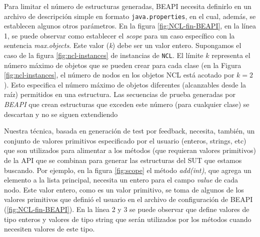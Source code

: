 Para limitar el número de estructuras generadas, BEAPI necesita definirlo en un archivo de descripción simple en formato \texttt{java.properties}, en el cual, además, se establecen algunos otros parámetros. En la figura \ref{fig:NCL-fin-BEAPI}, en la línea 1, se puede observar como establecer el \emph{scope} para un caso específico con la sentencia \emph{max.objects}. Este valor (\emph{k}) debe ser un valor entero. Supongamos el caso de la figura \ref{fig:ncl-instances} de instancias de \texttt{NCL}.  El límite $k$ representa el número máximo de objetos que se pueden crear para cada clase (en la Figura \ref{fig:ncl-instances}, el número de nodos en los objetos NCL está acotado por $k=2$). Esto especifica el número máximo de objetos diferentes (alcanzables desde la raíz) permitidos en una estructura. Las secuencias de prueba generadas por \emph{BEAPI} que crean estructuras que exceden este número (para cualquier clase) se descartan y no se siguen extendiendo

Nuestra técnica, basada en generación de test por feedback, necesita, también, un conjunto de valores primitivos especificado por el usuario (enteros, strings, etc) que son utilizados para alimentar a los métodos (que requieran valores primitivos) de la API que se combinan para generar las estructuras del SUT que estamos buscando.
Por ejemplo, en la figura \ref{fig:scope} el método \emph{add(int)}, que agrega un elemento a la lista principal, necesita un entero para el campo \emph{value} de cada nodo. Este valor entero, como es un valor primitivo, se toma de algunos de los valores primitivos que definió el usuario en el archivo de configuración de BEAPI (\ref{fig:NCL-fin-BEAPI}). En la línea 2 y 3 se puede observar que define valores de tipo enteros y valores de tipo string que serán utilizados por los métodos cuando necesiten valores de este tipo. 

